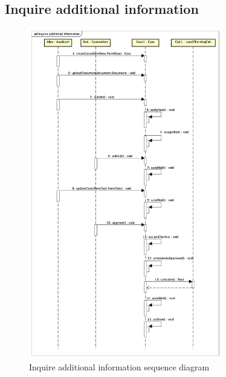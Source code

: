 \subsection{Inquire additional information}
\begin{figure}[htb!]
    \centering
    \includegraphics[width=0.75\textwidth]{img/sd-inquire-additional-information.png}
    \caption{Inquire additional information sequence diagram}
\end{figure}

